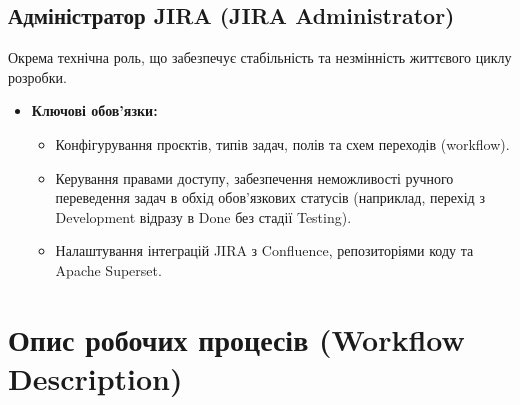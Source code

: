 \documentclass{article}
\begin{document}
\subsection{Адміністратор JIRA (JIRA Administrator)}
Окрема технічна роль, що забезпечує стабільність та незмінність життєвого циклу розробки.
\begin{itemize}
    \item \textbf{Ключові обов'язки:}
    \begin{itemize}
        \item Конфігурування проєктів, типів задач, полів та схем переходів (workflow).
        \item Керування правами доступу, забезпечення неможливості ручного переведення задач в обхід обов'язкових статусів (наприклад, перехід з Development відразу в Done без стадії Testing).
        \item Налаштування інтеграцій JIRA з Confluence, репозиторіями коду та Apache Superset.
    \end{itemize}
\end{itemize}

\section{Опис робочих процесів (Workflow Description)}
\end{document}
